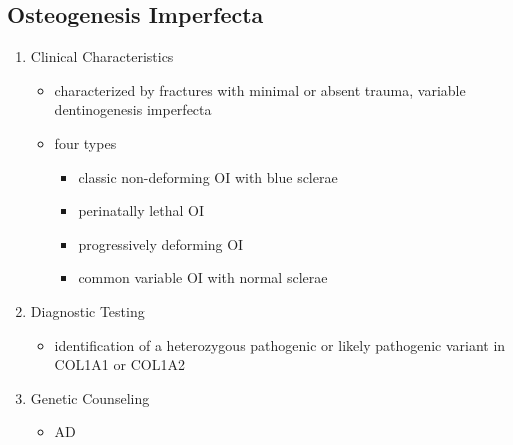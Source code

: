 \documentclass[12pt]{scrartcl}
\begin{document}
\subsection{Osteogenesis Imperfecta}
\label{sec:orgd1bdd4b}
\begin{enumerate}
\item Clinical Characteristics
\label{sec:orga020830}
\begin{itemize}
\item characterized by fractures with minimal or absent trauma, variable
dentinogenesis imperfecta
\item four types
\begin{itemize}
\item classic non-deforming OI with blue sclerae
\item perinatally lethal OI
\item progressively deforming OI
\item common variable OI with normal sclerae
\end{itemize}
\end{itemize}

\item Diagnostic Testing
\label{sec:org2e8c9d4}
\begin{itemize}
\item identification of a heterozygous pathogenic or likely pathogenic
variant in COL1A1 or COL1A2
\end{itemize}
\item Genetic Counseling
\label{sec:org5933688}
\begin{itemize}
\item AD
\end{itemize}
\end{enumerate}
\end{document}
